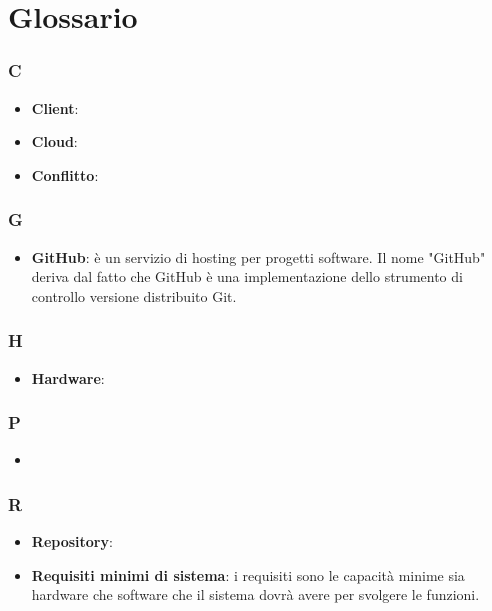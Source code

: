 \appendix

\section{Glossario}

\subsubsection{C}
\begin{itemize}
	\item \textbf{Client}:
	\item \textbf{Cloud}:
	\item \textbf{Conflitto}:
\end{itemize}
\subsubsection{G}
\begin{itemize}
	\item \textbf{GitHub}: è un servizio di hosting per progetti software. Il nome "GitHub" deriva dal fatto che
GitHub è una implementazione dello strumento di controllo versione distribuito Git.
\end{itemize}
\subsubsection{H}
\begin{itemize}
	\item \textbf{Hardware}:
\end{itemize}

\subsubsection{P}
\begin{itemize}
	\item 
\end{itemize}

\subsubsection{R}
\begin{itemize}
	\item \textbf{Repository}:
	\item \textbf{Requisiti minimi di sistema}: i requisiti sono le capacità minime sia hardware che software che il sistema dovrà avere per svolgere le funzioni.
\end{itemize}

